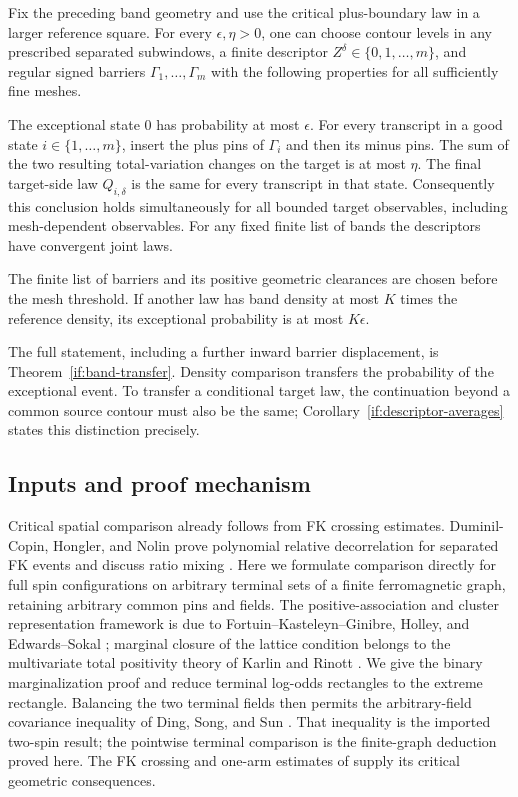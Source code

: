 \begin{theorem}\label{in:resolution}
Fix the preceding band geometry and use the critical plus-boundary law
in a larger reference square. For every $\epsilon,\eta>0$, one can
choose contour levels in any prescribed separated subwindows,
a finite descriptor $Z^\delta\in\{0,1,\ldots,m\}$, and regular
signed barriers $\Gamma_1,\ldots,\Gamma_m$ with the following properties
for all sufficiently fine meshes.

The exceptional state $0$ has probability at most $\epsilon$. For every
transcript in a good state $i\in\{1,\ldots,m\}$, insert the plus pins of $\Gamma_i$ and
then its minus pins. The sum of the two resulting total-variation
changes on the target is at most $\eta$. The final target-side law
$Q_{i,\delta}$ is the same for every transcript in that state.
Consequently this conclusion holds simultaneously for all bounded target
observables, including mesh-dependent observables. For any fixed finite
list of bands the descriptors have convergent joint laws.

The finite list of barriers and its positive geometric clearances are
chosen before the mesh threshold. If another law has band density at
most $K$ times the reference density, its exceptional probability is
at most $K\epsilon$.
\end{theorem}

The full statement, including a further inward barrier displacement,
is Theorem~\ref{if:band-transfer}. Density comparison transfers the
probability of the exceptional event. To transfer a conditional target
law, the continuation beyond a common source contour must also be the
same; Corollary~\ref{if:descriptor-averages} states this distinction
precisely.

\subsection{Inputs and proof mechanism}
Critical spatial comparison already follows from FK crossing estimates.
Duminil-Copin, Hongler, and Nolin prove polynomial relative decorrelation
for separated FK events and discuss ratio mixing
\cite[Section~5.3, Proposition~5.11, author-hosted version]{DHN2011}.
Here we formulate comparison directly for full spin configurations on
arbitrary terminal sets of a finite ferromagnetic graph, retaining
arbitrary common pins and fields. The positive-association and cluster
representation framework is due to Fortuin--Kasteleyn--Ginibre, Holley,
and Edwards--Sokal \cite{FKG1971,Holley1974,EdwardsSokal1988};
marginal closure of the lattice condition belongs to the multivariate
total positivity theory of Karlin and Rinott \cite{KarlinRinott1980}.
We give the binary marginalization proof and reduce terminal log-odds
rectangles to the extreme rectangle. Balancing the two terminal fields
then permits the arbitrary-field covariance inequality of Ding, Song,
and Sun \cite[Corollary~1.3]{DSS2023}. That inequality is the imported
two-spin result; the pointwise terminal comparison is the finite-graph
deduction proved here. The FK crossing and one-arm estimates of
\cite{DHN2011} supply its critical geometric consequences.


